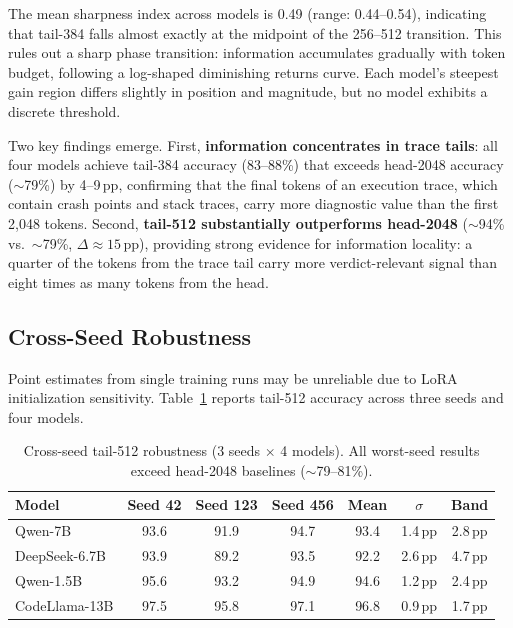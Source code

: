 \documentclass[11pt,a4paper]{article}
\newcommand{\pp}{\,pp}
\begin{document}
The mean sharpness index across models is 0.49 (range: 0.44--0.54), indicating that tail-384 falls almost exactly at the midpoint of the 256--512 transition. This rules out a sharp phase transition: information accumulates gradually with token budget, following a log-shaped diminishing returns curve. Each model's steepest gain region differs slightly in position and magnitude, but no model exhibits a discrete threshold.

Two key findings emerge. First, \textbf{information concentrates in trace tails}: all four models achieve tail-384 accuracy (83--88\%) that exceeds head-2048 accuracy ($\sim$79\%) by 4--9\pp, confirming that the final tokens of an execution trace, which contain crash points and stack traces, carry more diagnostic value than the first 2,048 tokens. Second, \textbf{tail-512 substantially outperforms head-2048} ($\sim$94\% vs.\ $\sim$79\%, $\Delta \approx 15$\pp), providing strong evidence for information locality: a quarter of the tokens from the trace tail carry more verdict-relevant signal than eight times as many tokens from the head.

\subsection{Cross-Seed Robustness}
\label{sec:seeds}

Point estimates from single training runs may be unreliable due to LoRA initialization sensitivity. Table~\ref{tab:crossseed} reports tail-512 accuracy across three seeds and four models.

\begin{table}[t]
\centering
\caption{Cross-seed tail-512 robustness (3 seeds $\times$ 4 models). All worst-seed results exceed head-2048 baselines ($\sim$79--81\%).}
\label{tab:crossseed}
\small
\begin{tabular}{@{}lcccccc@{}}
\toprule
Model & Seed 42 & Seed 123 & Seed 456 & Mean & $\sigma$ & Band \\
\midrule
Qwen-7B       & 93.6 & 91.9 & 94.7 & 93.4 & 1.4\pp & 2.8\pp \\
DeepSeek-6.7B & 93.9 & 89.2 & 93.5 & 92.2 & 2.6\pp & 4.7\pp \\
Qwen-1.5B     & 95.6 & 93.2 & 94.9 & 94.6 & 1.2\pp & 2.4\pp \\
CodeLlama-13B & 97.5 & 95.8 & 97.1 & 96.8 & 0.9\pp & 1.7\pp \\
\bottomrule
\end{tabular}
\end{table}
\end{document}
